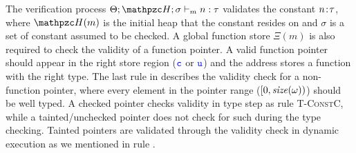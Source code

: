The verification process $\Theta;\heap;\sigma \vdash_m n : \tau$
validates the constant ${n}\!:\!{\tau}$, 
where $\heap(m)$ is the initial heap that the constant resides on and
$\sigma$ is a set of constant assumed to be checked.
A global function store $\Xi(m)$ is also required to check the validity of a function pointer.
A valid function pointer should appear in the right store region ($\textcolor{blue}{\texttt{c}}$ or $\textcolor{blue}{\texttt{u}}$)
and the address stores a function with the right type.
The last rule in  describes the validity check for a non-function pointer, 
where every element in the pointer range ($[0,\mathit{size}(\omega))$) should be well
typed.
A checked pointer checks validity in type step as rule \textsc{T-ConstC},
while a tainted/unchecked pointer does not check for such during the type checking.
Tainted pointers are validated through the validity check in dynamic execution as we mentioned in rule .







